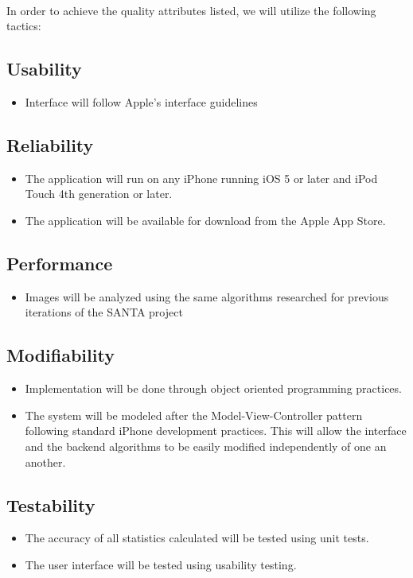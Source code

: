 \paragraph{} In order to achieve the quality attributes listed, we will utilize the following tactics:

\subsection{Usability}
	\begin{itemize}
	\item Interface will follow Apple's interface guidelines
	\end{itemize}
\subsection{Reliability}
	\begin{itemize}
	\item The application will run on any iPhone running iOS 5 or later and iPod Touch 4th generation or later. 
	\item The application will be available for download from the Apple App Store.
	\end{itemize}
\subsection{Performance}
	\begin{itemize}
	\item Images will be analyzed using the same algorithms researched for previous iterations of the SANTA project
	\end{itemize}
\subsection{Modifiability}
	\begin{itemize}
	\item Implementation will be done through object oriented programming practices.
	\item The system will be modeled after the Model-View-Controller pattern following standard iPhone development practices.  This will allow the interface and the backend algorithms to be easily modified independently of one an another.
	\end{itemize}
\subsection{Testability}
	\begin{itemize}
	\item The accuracy of all statistics calculated will be tested using unit tests.
	\item The user interface will be tested using usability testing.
	\end{itemize}